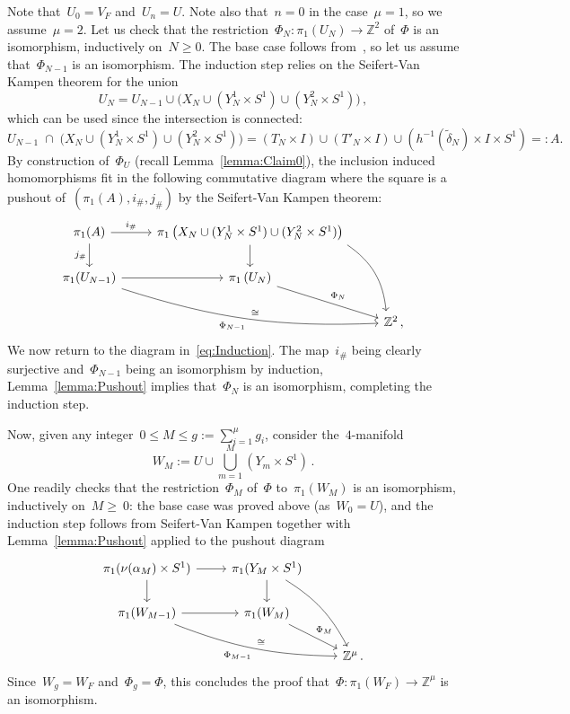 \documentclass[10.9pt,a4paper]{amsart}
\theoremstyle{definition}
\theoremstyle{remark}
\newcommand{\Z}{\mathbb{Z}}
\begin{document}
Note that~$U_0=V_F$ and~$U_n=U$. Note also that~$n=0$ in the case~$\mu=1$, so we assume~$\mu=2$.
Let us check that the restriction~$\Phi_N\colon \pi_1(U_N)\to\Z^2$ of~$\Phi$
is an isomorphism, inductively on~$N\ge 0$.
The base case follows from~\cite[Proposition~3.1]{CFT18}, so let us assume that~$\Phi_{N-1}$ is an isomorphism.
The induction step relies on the Seifert-Van Kampen theorem for the union
\[
U_N=U_{N-1}\cup \big( X_{N} \cup (Y_{N}^1 \times S^1) \cup (Y_{N}^2 \times S^1) \big)\,,
\]
which can be used since the intersection is connected:
\[
U_{N-1} \; \cap \; \big ( X_{N} \cup (Y_{N}^1 \times S^1) \cup (Y_N^2 \times S^1) \big) = (T_N \times I) \cup (T'_N \times I) \cup (h^{-1}(\tilde \delta_N) \times I \times S^1)=:A.
\]
By construction of~$\Phi_U$ (recall Lemma~\ref{lemma:Claim0}), the inclusion induced homomorphisms fit in the following commutative diagram where the square is a pushout of~$(\pi_1(A),i_\#,j_\#)$ by the Seifert-Van Kampen theorem:
\begin{equation}
\label{eq:Induction}
\begin{tikzcd}
\pi_1(A) \arrow{d}[swap]{j_\#} \arrow{r}{i_\#} & \pi_1\left(X_N \cup (Y_N^1 \times S^1) \cup (Y_{N}^2 \times S^1)\right) \arrow{d} \arrow[bend left =25]{ddr}{} & \\
\pi_1(U_{N-1}) \arrow{r} \arrow[bend right=10, swap]{drr}{\Phi_{N-1}}[swap]{\cong} & \pi_1\left(U_N \right) \arrow{dr}{\Phi_N} & \\
& & \Z^2\,,
\end{tikzcd}
\end{equation}
We now return to the diagram in~\eqref{eq:Induction}.
The map~$i_\#$ being clearly surjective and~$\Phi_{N-1}$ being an isomorphism by induction,
Lemma~\ref{lemma:Pushout} implies that~$\Phi_N$ is an isomorphism, completing the induction step.

Now, given any integer~$0\le M\le g:=\sum_{i=1}^\mu g_i$, consider the~$4$-manifold
\[
W_M:=U\cup\bigcup_{m=1}^M\left(Y_m\times S^1\right)\,.
\]
One readily checks that the restriction~$\Phi_M$ of~$\Phi$ to~$\pi_1(W_M)$
is an isomorphism, inductively on~$M\ge~0$: the base case was proved above (as~$W_0=U$), and the induction step follows from Seifert-Van Kampen together with Lemma~\ref{lemma:Pushout} applied to the pushout diagram
\begin{equation}
\label{eq:OtherPushout}
\begin{tikzcd}
\pi_1(\nu(\alpha_M) \times S^1) \arrow{d} \arrow{r} & \pi_1(Y_M \times S^1) \arrow{d} \arrow[bend left =15]{ddr} & \\
\pi_1(W_{M-1}) \arrow{r} \arrow[bend right=10, swap]{drr}{\Phi_{M-1}}[swap]{\cong} & \pi_1(W_M) \arrow{dr} {\Phi_M}& \\
& & \Z^\mu\,.
\end{tikzcd}
\end{equation}
Since~$W_{g}=W_F$ and~$\Phi_{g}=\Phi$, this concludes the proof that~$\Phi\colon\pi_1(W_F)\to\Z^\mu$
is an isomorphism.
\end{document}
